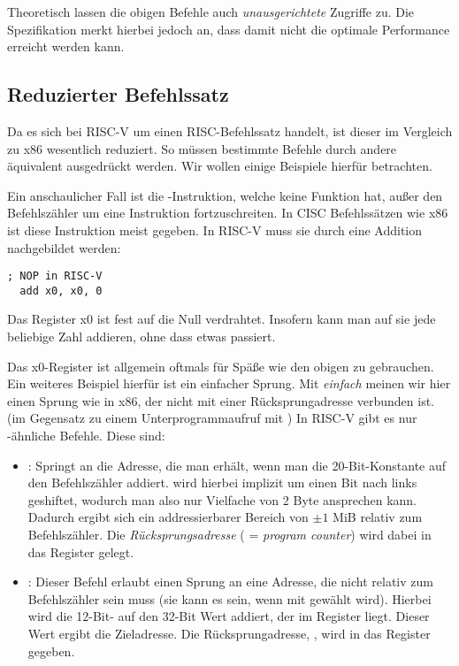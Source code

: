Theoretisch lassen die obigen Befehle auch \emph{unausgerichtete}
Zugriffe zu. Die Spezifikation merkt hierbei jedoch an,
dass damit nicht die optimale Performance erreicht werden kann.

\subsection{Reduzierter Befehlssatz}

Da es sich bei RISC-V um einen RISC-Befehlssatz handelt, ist dieser im Vergleich
zu x86 wesentlich reduziert. So müssen bestimmte Befehle durch andere äquivalent
ausgedrückt werden. Wir wollen einige Beispiele hierfür betrachten.

Ein anschaulicher Fall ist die -Instruktion, welche keine Funktion
hat, außer den Befehlszähler um eine Instruktion fortzuschreiten. In CISC
Befehlssätzen wie x86 ist diese Instruktion meist gegeben. In RISC-V muss sie
durch eine Addition nachgebildet werden:

\begin{lstlisting}[style=risc-v_Assembler]
  ; NOP in RISC-V
  add x0, x0, 0
\end{lstlisting}

Das Register x0 ist fest auf die Null verdrahtet. Insofern kann man auf sie
jede beliebige Zahl addieren, ohne dass etwas passiert.

Das x0-Register ist allgemein oftmals für Späße wie den obigen zu gebrauchen. Ein
weiteres Beispiel hierfür ist ein einfacher Sprung. Mit \emph{einfach} meinen
wir hier einen Sprung wie  in x86, der nicht mit einer
Rücksprungadresse verbunden ist. (im Gegensatz zu einem Unterprogrammaufruf mit
) In RISC-V gibt es nur -ähnliche Befehle. Diese sind:

\begin{itemize}
  \item {}: Springt an die Adresse, die man
    erhält, wenn man die 20-Bit-Konstante  auf den Befehlszähler
    addiert.  wird hierbei implizit um einen Bit nach links
    geshiftet, wodurch man also nur Vielfache von 2 Byte ansprechen
    kann. Dadurch ergibt sich ein addressierbarer Bereich von $\pm 1$ MiB
    relativ zum Befehlszähler. Die \emph{Rücksprungsadresse} 
    ( = \emph{program counter}) wird dabei in das Register
     gelegt.
 \item {}: Dieser Befehl erlaubt einen Sprung an eine Adresse, die nicht relativ zum Befehlszähler sein muss (sie
   kann es sein, wenn  mit  gewählt wird). Hierbei wird
   die 12-Bit- auf den 32-Bit Wert addiert, der im Register
    liegt. Dieser Wert ergibt die Zieladresse. Die
   Rücksprungadresse, , wird in das Register 
   gegeben.
\end{itemize}

